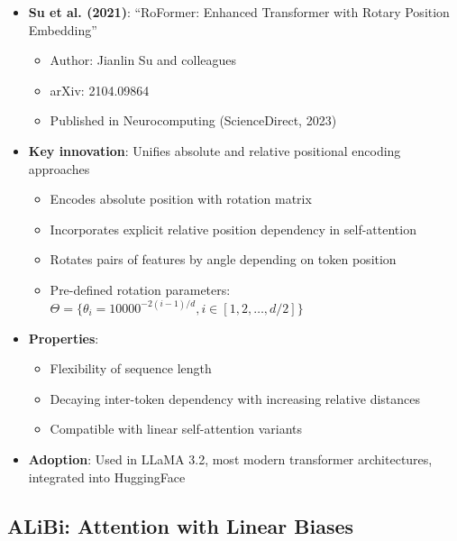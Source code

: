 \documentclass[11pt,letterpaper]{article}
\begin{document}
\begin{itemize}[leftmargin=*]
    \item \textbf{Su et al. (2021)}: ``RoFormer: Enhanced Transformer with Rotary Position Embedding''
    \begin{itemize}
        \item Author: Jianlin Su and colleagues
        \item arXiv: 2104.09864
        \item Published in Neurocomputing (ScienceDirect, 2023)
    \end{itemize}

    \item \textbf{Key innovation}: Unifies absolute and relative positional encoding approaches
    \begin{itemize}
        \item Encodes absolute position with rotation matrix
        \item Incorporates explicit relative position dependency in self-attention
        \item Rotates pairs of features by angle depending on token position
        \item Pre-defined rotation parameters: $\Theta = \{\theta_i = 10000^{-2(i-1)/d}, i \in [1, 2, \ldots, d/2]\}$
    \end{itemize}

    \item \textbf{Properties}:
    \begin{itemize}
        \item Flexibility of sequence length
        \item Decaying inter-token dependency with increasing relative distances
        \item Compatible with linear self-attention variants
    \end{itemize}

    \item \textbf{Adoption}: Used in LLaMA 3.2, most modern transformer architectures, integrated into HuggingFace
\end{itemize}

\subsection{ALiBi: Attention with Linear Biases}
\end{document}
